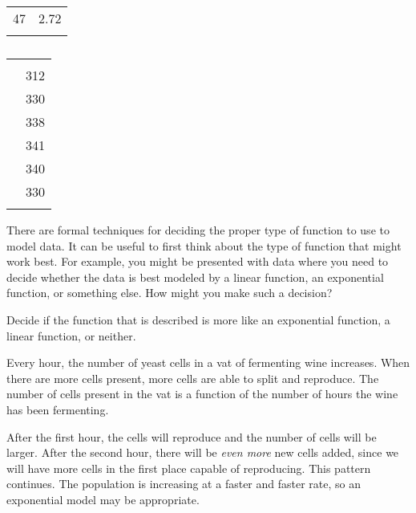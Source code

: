 \begin{essentialskills}
\begin{table}[!htb]
\begin{minipage}{0.25\textwidth}
\begin{tabular}{S[table-format=2.0]S[table-format=1.2]}
				47            & 2.72          \\\lastline
			\end{tabular}
		\end{minipage}
		\hfill
		\begin{minipage}{0.25\textwidth}
			\centering
			\caption{}\label{exp:tab:neitherdata}
			\begin{tabular}{S[table-format=2.0]S[table-format=3.0]}
				\beforeheading
				 &  \\
				             & 312           \\             & 330           \\             & 338           \\             & 341           \\            & 340           \\            & 330           \\\lastline
			\end{tabular}
		\end{minipage}
		\hfill
	\end{table}
\end{essentialskills}
			
There are formal techniques for deciding the proper type of function to use to model data. It can be useful to first think about the type of function that might work best.  For example, you might be presented with data where you need to decide whether the data is best modeled by a linear function, an exponential function, or something else.  How might you make such a decision?
\begin{pccexample}
	Decide if the function that is described is more like an exponential function, a linear function, or neither.
										
	Every hour, the number of yeast cells in a vat of fermenting wine increases.  
	When there are more cells present, more cells are able to split and reproduce. The number of cells present in the vat
	is a function of the number of hours the wine has been fermenting.
	\begin{pccsolution}
		After the first hour, the cells will reproduce and the number of cells will be larger.  After the second hour, there will be \emph{even more} new cells added, since we will have more cells in the first place capable of reproducing.  This pattern continues.  The population is increasing at a faster and faster rate, so an exponential model may be appropriate.
	\end{pccsolution}
\end{pccexample}
			
